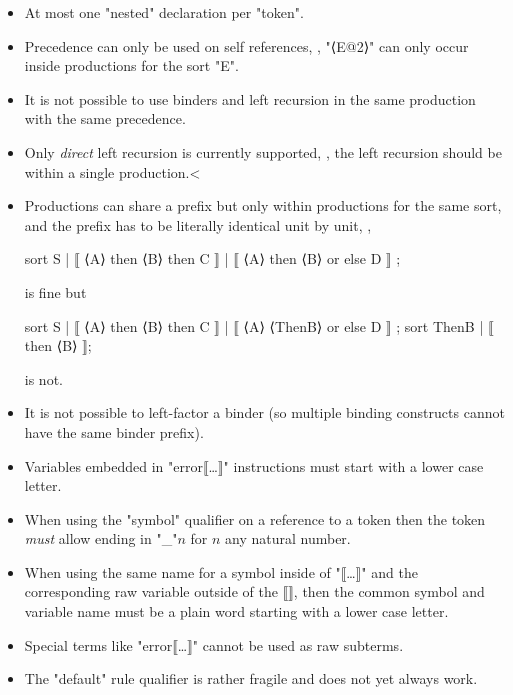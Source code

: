\documentclass[11pt]{article} %
\begin{document}
\begin{itemize}

\item At most one "nested" declaration per "token".

\item Precedence can only be used on self references, \ie, "⟨E@2⟩" can only occur inside
  productions for the sort "E".

\item It is not possible to use binders and left recursion in the same production with the same
  precedence.

\item Only \emph{direct} left recursion is currently supported, \ie, the left recursion should be
  within a single production.<

\item Productions can share a prefix but only within productions for the same sort, and the prefix
  has to be literally identical unit by unit, \ie,
  \begin{code}
sort S | ⟦ ⟨A⟩ then ⟨B⟩ then C ⟧
       | ⟦ ⟨A⟩ then ⟨B⟩ or else D ⟧ ;
\end{code}
is fine but
\begin{code}
sort S | ⟦ ⟨A⟩ then ⟨B⟩ then C ⟧
       | ⟦ ⟨A⟩ ⟨ThenB⟩ or else D ⟧ ;
sort ThenB | ⟦ then ⟨B⟩ ⟧;
\end{code}
is not.

\item It is not possible to left-factor a binder (so multiple binding constructs cannot have the
  same binder prefix).

\item Variables embedded in "error⟦…⟧" instructions must start with a lower case letter.

\item When using the "symbol" qualifier on a reference to a token then the token \emph{must} allow
  ending in "_"$n$ for $n$ any natural number.

\item When using the same name for a symbol inside of "⟦…⟧" and the corresponding raw variable
  outside of the ⟦⟧, then the common symbol and variable name must be a plain word starting with a
  lower case letter.

\item Special terms like "error⟦…⟧" cannot be used as raw subterms.

\item The "default" rule qualifier is rather fragile and does not yet always work.

\end{itemize}



\end{document}
